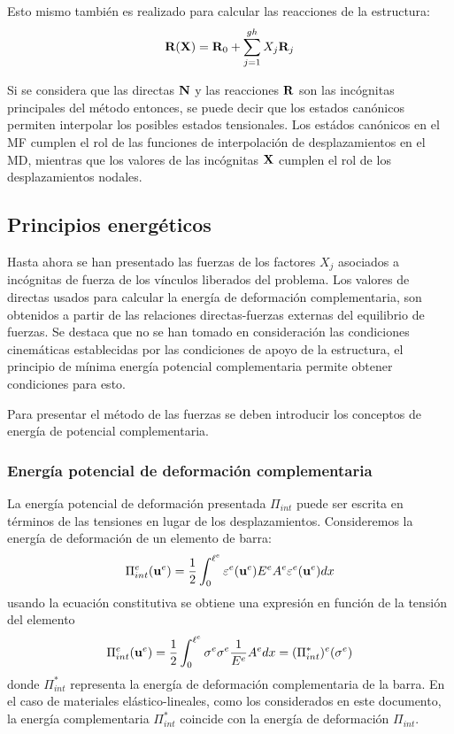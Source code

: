 Esto mismo también es realizado para calcular las reacciones de la estructura:
%
\begin{equation}
\textbf{R}({\bf X}) = \textbf{R}_0 + \sum_{j=1}^{gh} X_j \textbf{R}_j
\end{equation}

Si se considera que las directas ${\bf N}$ y las reacciones ${\bf R}$ son las incógnitas principales del método entonces, se puede decir que los estados canónicos permiten interpolar los posibles estados tensionales. Los estádos canónicos en el MF cumplen el rol de las funciones de interpolación de desplazamientos en el MD, mientras que los valores de las incógnitas ${\bf X}$ cumplen el rol de los desplazamientos nodales.

\subsection{Principios energéticos}

Hasta ahora se han presentado las fuerzas de los factores $X_j$ asociados a incógnitas de fuerza de los vínculos liberados del problema. %
%
Los valores de directas usados para calcular la energía de deformación complementaria, son obtenidos a partir de las relaciones directas-fuerzas externas del equilibrio de fuerzas. %
%
Se destaca que no se han tomado en consideración las condiciones cinemáticas establecidas por las condiciones de apoyo de la estructura, el principio de mínima energía potencial complementaria permite obtener condiciones para esto.


Para presentar el método de las fuerzas se deben introducir los conceptos de energía de potencial complementaria. %

\subsubsection{Energía potencial de deformación complementaria}
%
La energía potencial de deformación presentada $\Pi_{int}$ puede ser escrita en términos de las tensiones en lugar de los desplazamientos. %
%
Consideremos la energía de deformación de un elemento de barra:
%
\begin{equation}
\Pi_{int}^e({\bf u}^e) = \frac{1}{2} \int_0^{\ell^e} \varepsilon^e({\bf u}^e) E^e A^e \varepsilon^e({\bf u}^e) dx
\end{equation}
%
usando la ecuación constitutiva se obtiene una expresión en función de la tensión del elemento
%
\begin{equation}
\Pi_{int}^e({\bf u}^e) = \frac{1}{2} \int_0^{\ell^e} \sigma^e \sigma^e \frac{1}{E^e} A^e dx = (\Pi_{int}^*)^e(\sigma^e) 
\end{equation}
%
donde $\Pi_{int}^*$ representa la energía de deformación complementaria de la barra. %
%
En el caso de materiales elástico-lineales, como los considerados en este documento, la energía complementaria $\Pi_{int}^*$ coincide con la energía de deformación $\Pi_{int}$.

